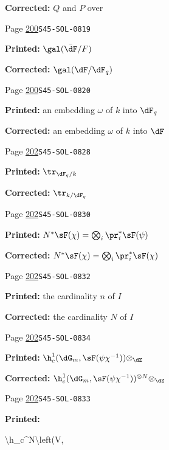 \begin{description}
\par\noindent\textbf{Corrected:} $Q$ and $P$ over
\smallskip
\item[\hypertarget{apparatus:EN-0132}{132}] Page \hyperlink{printpage:en:200}{200}\quad\texttt{S45-SOL-0819}
\par\noindent\textbf{Printed:} \(\gal(\bar\dF/F)\)
\par\noindent\textbf{Corrected:} \(\gal(\dF/\dF_q)\)
\smallskip
\item[\hypertarget{apparatus:EN-0133}{133}] Page \hyperlink{printpage:en:200}{200}\quad\texttt{S45-SOL-0820}
\par\noindent\textbf{Printed:} an embedding $\omega$ of $k$ into $\dF_q$
\par\noindent\textbf{Corrected:} an embedding $\omega$ of $k$ into $\dF$
\smallskip
\item[\hypertarget{apparatus:EN-0134}{134}] Page \hyperlink{printpage:en:202}{202}\quad\texttt{S45-SOL-0828}
\par\noindent\textbf{Printed:} \(\tr_{\dF_q/k}\)
\par\noindent\textbf{Corrected:} \(\tr_{k/\dF_q}\)
\smallskip
\item[\hypertarget{apparatus:EN-0135}{135}] Page \hyperlink{printpage:en:202}{202}\quad\texttt{S45-SOL-0830}
\par\noindent\textbf{Printed:} \(N^\ast\sF(\chi) = \bigotimes_i \pr_i^\ast\sF(\psi)\)
\par\noindent\textbf{Corrected:} \(N^\ast\sF(\chi) = \bigotimes_i \pr_i^\ast\sF(\chi)\)
\smallskip
\item[\hypertarget{apparatus:EN-0136}{136}] Page \hyperlink{printpage:en:202}{202}\quad\texttt{S45-SOL-0832}
\par\noindent\textbf{Printed:} the cardinality $n$ of $I$
\par\noindent\textbf{Corrected:} the cardinality $N$ of $I$
\smallskip
\item[\hypertarget{apparatus:EN-0137}{137}] Page \hyperlink{printpage:en:202}{202}\quad\texttt{S45-SOL-0834}
\par\noindent\textbf{Printed:} \(\h_c^1(\dG_m,\sF(\psi\chi^{-1})) \otimes_\dZ\)
\par\noindent\textbf{Corrected:} \(\h_c^1(\dG_m,\sF(\psi\chi^{-1}))^{\otimes N} \otimes_\dZ\)
\smallskip
\item[\hypertarget{apparatus:EN-0138}{138}] Page \hyperlink{printpage:en:202}{202}\quad\texttt{S45-SOL-0833}
\par\noindent\textbf{Printed:} {\footnotesize\ttfamily\raggedright \textbackslash{}\allowbreak{}h\_\allowbreak{}c\textasciicircum{}\allowbreak{}N\textbackslash{}\allowbreak{}left(\allowbreak{}V,\allowbreak{}\par}

\end{description}
